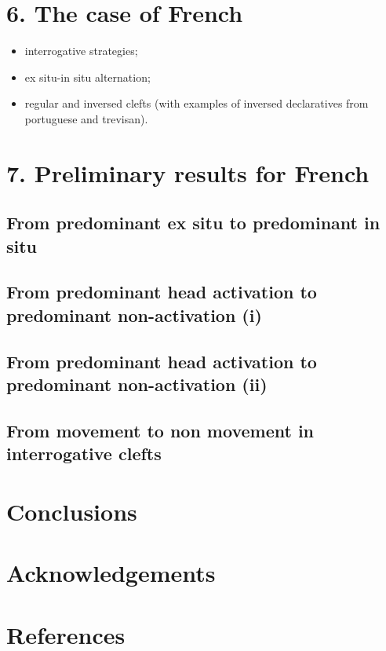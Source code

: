 \documentclass[fleqn,10pt]{wlscirep}
\begin{document}
\section*{6. The case of French}

\begin{itemize}
    \item interrogative strategies;
    \item ex situ-in situ alternation;
    \item regular and inversed clefts (with examples of inversed declaratives from portuguese and trevisan).
    \end{itemize}

\section*{7. Preliminary results for French}

\subsection*{From predominant ex situ to predominant in situ}

\subsection*{From predominant head activation to predominant non-activation (i)}

\subsection*{From predominant head activation to predominant non-activation (ii)}

\subsection*{From movement to non movement in interrogative clefts}

\section*{Conclusions}





\section*{Acknowledgements}

\section*{References}
\end{document}
